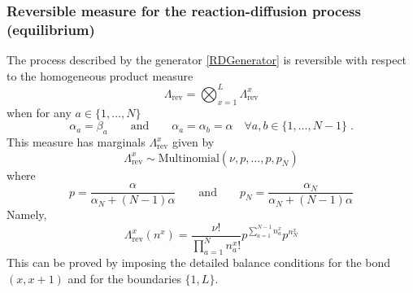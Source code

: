 \documentclass[10pt]{article}
\numberwithin{equation}{section}
\numberwithin{equation}{subsection}
\newcommand{\dt}{\;.}
\newcommand{\twoj}{\nu}
\begin{document}
\subsubsection{Reversible measure for the reaction-diffusion process (equilibrium)} 
The process described by the generator \eqref{RDGenerator} is reversible with respect to the homogeneous product measure \begin{equation}\label{reversibleMeasureRD}
	\Lambda_{\text{rev}}=\bigotimes_{x=1}^{L}\Lambda_{\text{rev}}^{x}
\end{equation}
when for any $a\in\{1,\ldots,N\}$
\begin{equation}\label{reversibilityConditionRD}
	\alpha_{a}=\beta_{a}\qquad\text{and}\qquad \alpha_{a}=\alpha_{b}=\alpha \quad \forall a,b\in \{1,\ldots,N-1\}\dt
\end{equation}
This measure has marginals $\Lambda_{\text{rev}}^{x}$ given by 
\begin{equation}
	\Lambda^{x}_{\text{rev}}\sim \text{Multinomial}\left(\twoj,p,\ldots,p,p_{N}\right)
\end{equation}
where 
\begin{equation}
	p=\frac{\alpha}{\alpha_{N}+(N-1)\alpha}\qquad \text{and}\qquad p_{N}=\frac{\alpha_{N}}{\alpha_{N}+(N-1)\alpha}
\end{equation}
Namely,
\begin{equation}
	\Lambda_{\text{rev}}^{x}(n^{x})=\frac{\nu!}{\prod_{a=1}^{N}n_{a}^{x}!}p^{\sum_{a=1}^{N-1}n_{a}^{x}}p^{n_{N}^{x}}
\end{equation}
This can be proved by imposing the detailed balance conditions for the bond $(x,x+1)$ and for the boundaries $\{1,L\}$.\\
\end{document}
